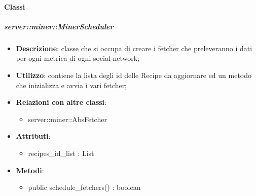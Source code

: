 \paragraph{Classi} %
		\subparagraph{server::miner::MinerScheduler} %
		\label{subp:server_miner_MinerScheduler}
			\begin{itemize}
				\item \textbf{Descrizione}: classe che si occupa di creare i fetcher che preleveranno i dati per ogni metrica di ogni social network;
				\item \textbf{Utilizzo}: contiene la lista degli id delle Recipe da aggiornare ed un metodo che inizializza e avvia i vari fetcher;
				\item \textbf{Relazioni con altre classi}:
					\begin{itemize}
						\item server::miner::AbsFetcher
					\end{itemize}
				\item \textbf{Attributi}:
					\begin{itemize}
						\item recipes\_id\_list : List
					\end{itemize}
				\item \textbf{Metodi}:   
					\begin{itemize}
						\item public schedule\_fetchers() : boolean
					\end{itemize}
			\end{itemize}

